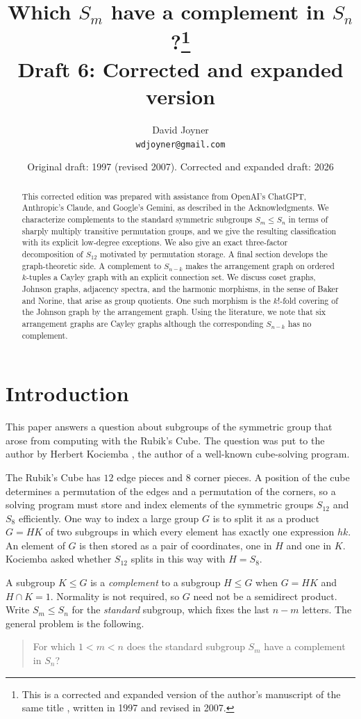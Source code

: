 \documentclass[12pt,letterpaper]{article}
\title{Which $S_m$ have a complement in $S_n$?\thanks{This is a corrected and expanded version of the author's manuscript of the same title \cite{Jo97}, written in 1997 and revised in 2007.}\\\large Draft 6: Corrected and expanded version}
\author{David Joyner\\\texttt{wdjoyner@gmail.com}}
\date{Original draft: 1997 (revised 2007). Corrected and expanded draft: 2026}
\numberwithin{equation}{section}
\theoremstyle{definition}
\begin{document}
\maketitle
\begin{abstract}
This corrected edition was prepared with assistance from OpenAI's ChatGPT, Anthropic's Claude, and Google's Gemini, as described in the Acknowledgments. We characterize complements to the standard symmetric subgroups $S_m\leq S_n$ in terms of sharply multiply transitive permutation groups, and we give the resulting classification with its explicit low-degree exceptions. We also give an exact three-factor decomposition of $S_{12}$ motivated by permutation storage. A final section develops the graph-theoretic side. A complement to $S_{n-k}$ makes the arrangement graph on ordered $k$-tuples a Cayley graph with an explicit connection set. We discuss coset graphs, Johnson graphs, adjacency spectra, and the harmonic morphisms, in the sense of Baker and Norine, that arise as group quotients. One such morphism is the $k!$-fold covering of the Johnson graph by the arrangement graph. Using the literature, we note that six arrangement graphs are Cayley graphs although the corresponding $S_{n-k}$ has no complement.
\end{abstract}

\tableofcontents

\section{Introduction}
This paper answers a question about subgroups of the symmetric group that arose from computing with the Rubik's Cube. The question was put to the author by Herbert Kociemba \cite{Ko97}, the author of a well-known cube-solving program.

The Rubik's Cube has $12$ edge pieces and $8$ corner pieces. A position of the cube determines a permutation of the edges and a permutation of the corners, so a solving program must store and index elements of the symmetric groups $S_{12}$ and $S_8$ efficiently. One way to index a large group $G$ is to split it as a product $G=HK$ of two subgroups in which every element has exactly one expression $hk$. An element of $G$ is then stored as a pair of coordinates, one in $H$ and one in $K$. Kociemba asked whether $S_{12}$ splits in this way with $H=S_8$.

A subgroup $K\leq G$ is a \emph{complement} to a subgroup $H\leq G$ when $G=HK$ and $H\cap K=1$. Normality is not required, so $G$ need not be a semidirect product. Write $S_m\leq S_n$ for the \emph{standard} subgroup, which fixes the last $n-m$ letters. The general problem is the following.
\begin{quote}
For which $1<m<n$ does the standard subgroup $S_m$ have a complement in $S_n$?
\end{quote}
\end{document}
